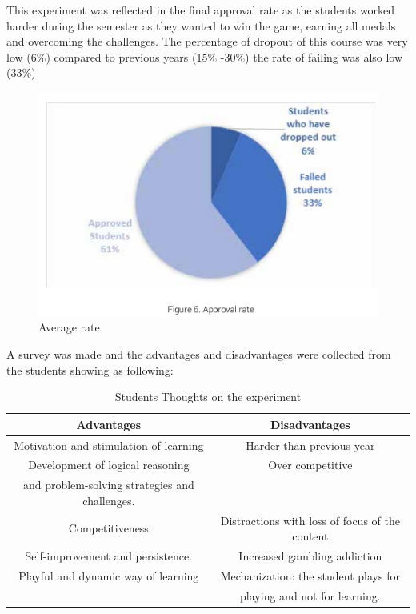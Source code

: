 \documentclass[../main.tex]{subfiles}
\begin{document}
This experiment was reflected in the final approval rate as the students worked harder during the semester as they wanted to win the game, earning all medals and overcoming the challenges. The percentage of dropout of this course was very low (6\%) compared to previous years (15\% -30\%) the rate of failing was also low (33\%) 

\begin{figure}[!ht]
\centering
\includegraphics[scale=0.3]{images/chapter2/image18.png}
\caption{ Average rate}
\label{fig: Average rate}
\end{figure}
\newpage
A survey was made and the advantages and disadvantages were collected from the students showing as following:

\begin{table}[h!]
    \caption{Students Thoughts on the experiment}  
    \centering
    \begin{tabular}{|c|c|}
       \hline
       Advantages & Disadvantages \\
       \hline
       Motivation and stimulation of learning & Harder than previous year \\
       \hline
       Development of logical reasoning  & Over competitive \\ and problem-solving strategies and challenges. & \\
       \hline
       Competitiveness & Distractions with loss of focus of the content \\
       \hline
       Self-improvement and persistence. & Increased gambling addiction \\ 
       \hline
       Playful and dynamic way of learning & Mechanization: the student plays for \\ & playing and not for learning. \\
       \hline
       \end{tabular}
    \label{tab:5}
\end{table}
\end{document}
